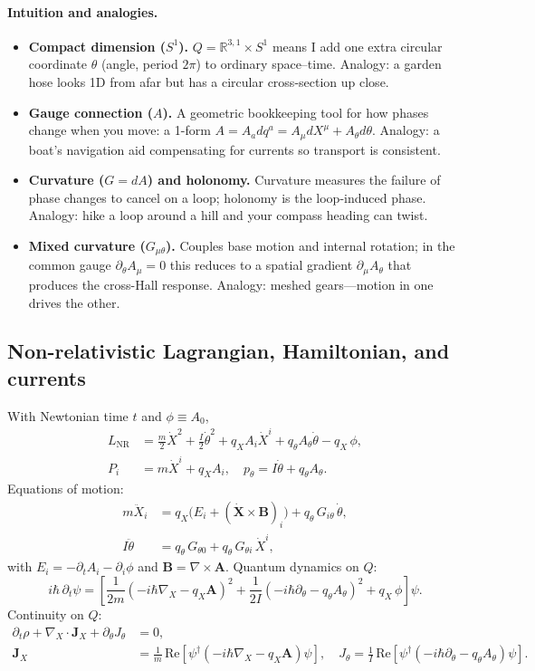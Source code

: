 \paragraph{Intuition and analogies.}
\begin{itemize}
  \item \textbf{Compact dimension ($S^1$).} $Q=\mathbb R^{3,1}\times S^1$ means I add one extra circular coordinate $\theta$ (angle, period $2\pi$) to ordinary space--time. Analogy: a garden hose looks 1D from afar but has a circular cross-section up close.
  \item \textbf{Gauge connection ($A$).} A geometric bookkeeping tool for how phases change when you move: a 1-form $A=A_a dq^a=A_\mu dX^\mu + A_\theta d\theta$. Analogy: a boat's navigation aid compensating for currents so transport is consistent.
  \item \textbf{Curvature ($G=dA$) and holonomy.} Curvature measures the failure of phase changes to cancel on a loop; holonomy is the loop-induced phase. Analogy: hike a loop around a hill and your compass heading can twist.
  \item \textbf{Mixed curvature ($G_{\mu\theta}$).} Couples base motion and internal rotation; in the common gauge $\partial_\theta A_\mu=0$ this reduces to a spatial gradient $\partial_\mu A_\theta$ that produces the cross-Hall response. Analogy: meshed gears---motion in one drives the other.
\end{itemize}

\subsection{Non-relativistic Lagrangian, Hamiltonian, and currents}\label{sec:nr-lagrangian}
With Newtonian time $t$ and $\phi\equiv A_0$,
\begin{align}
L_{\mathrm{NR}}&=\frac{m}{2}\dot X^2+\frac{I}{2}\dot\theta^2+q_X A_i\dot X^i+q_\theta A_\theta\dot\theta - q_X\,\phi,\\
P_i&=m\dot X^i+q_X A_i,\quad p_\theta=I\dot\theta+q_\theta A_\theta.
\end{align}
Equations of motion:
\begin{align}
m\ddot X_i &= q_X\big(E_i + (\dot{\bm X}\times\bm B)_i\big) + q_\theta\,G_{i\theta}\,\dot\theta,\\
I\ddot\theta &= q_\theta\,G_{\theta 0}+ q_\theta\,G_{\theta i}\,\dot X^i,
\end{align}
with $E_i=-\partial_tA_i-\partial_i\phi$ and $\bm B=\nabla\times\bm A$. Quantum dynamics on $Q$:
\begin{equation}
 i\hbar\,\partial_t\psi = \left[\frac{1}{2m}(-i\hbar\nabla_X-q_X\bm A)^2 + \frac{1}{2I}(-i\hbar\partial_\theta-q_\theta A_\theta)^2 + q_X\,\phi\right]\psi.
\end{equation}
Continuity on $Q$:
\begin{align}
 \partial_t\rho + \nabla_X\!\cdot\bm J_X + \partial_\theta J_\theta&=0,\\
 \bm J_X&=\frac{1}{m}\,\mathrm{Re}[\psi^\dagger(-i\hbar\nabla_X-q_X\bm A)\psi],\quad J_\theta=\frac{1}{I}\,\mathrm{Re}[\psi^\dagger(-i\hbar\partial_\theta-q_\theta A_\theta)\psi].
\end{align}


